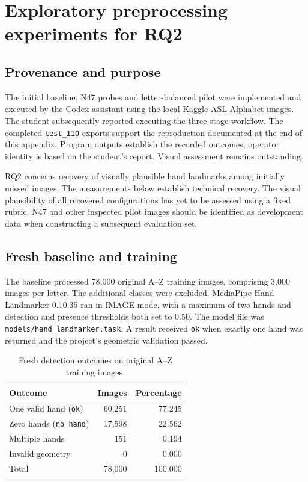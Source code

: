 \section{Exploratory preprocessing experiments for RQ2}
\label{app:rq2-pilot}

\subsection{Provenance and purpose}
The initial baseline, N47 probes and letter-balanced pilot were implemented and executed by the Codex assistant using the local Kaggle ASL Alphabet images. The student subsequently reported executing the three-stage workflow. The completed \texttt{test\_110} exports support the reproduction documented at the end of this appendix. Program outputs establish the recorded outcomes; operator identity is based on the student's report. Visual assessment remains outstanding.

RQ2 concerns recovery of visually plausible hand landmarks among initially missed images. The measurements below establish technical recovery. The visual plausibility of all recovered configurations has yet to be assessed using a fixed rubric. N47 and other inspected pilot images should be identified as development data when constructing a subsequent evaluation set.

\subsection{Fresh baseline and training}
The baseline processed 78,000 original A--Z training images, comprising 3,000 images per letter. The additional classes were excluded. MediaPipe Hand Landmarker 0.10.35 ran in IMAGE mode, with a maximum of two hands and detection and presence thresholds both set to 0.50. The model file was \texttt{models/hand\_landmarker.task}. A result received \texttt{ok} when exactly one hand was returned and the project's geometric validation passed.

\begin{table}[ht]\centering
\caption{Fresh detection outcomes on original A--Z training images.}
\label{tab:rq2-baseline}
\begin{tabular}{lrr}\toprule
Outcome & Images & Percentage\\\midrule
One valid hand (\texttt{ok}) & 60,251 & 77.245\\
Zero hands (\texttt{no\_hand}) & 17,598 & 22.562\\
Multiple hands & 151 & 0.194\\
Invalid geometry & 0 & 0.000\\\midrule
Total & 78,000 & 100.000\\\bottomrule
\end{tabular}
\end{table}

